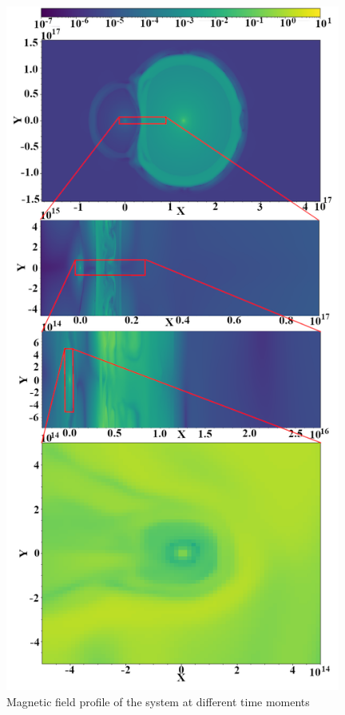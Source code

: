 \documentclass[a4paper,12pt]{extreport}
\begin{document}
\begin{figure}
\begin{minipage}{0.48\textwidth}
		\label{density}
	\end{minipage}\hfill
	\begin{minipage}{0.48\textwidth}
		\centering
		\includegraphics[width=0.98\textwidth]{./fig/Bfield.png} 
		\caption{Magnetic field profile of the system at different time moments}
		\label{Bfield}
	\end{minipage}
\end{figure}
\end{document}
